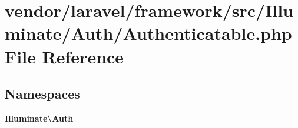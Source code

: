 \section{vendor/laravel/framework/src/\+Illuminate/\+Auth/\+Authenticatable.php File Reference}
\label{_auth_2_authenticatable_8php}
\subsection*{Namespaces}
\begin{DoxyCompactItemize}
\item 
 {\bf Illuminate\textbackslash{}\+Auth}
\end{DoxyCompactItemize}
